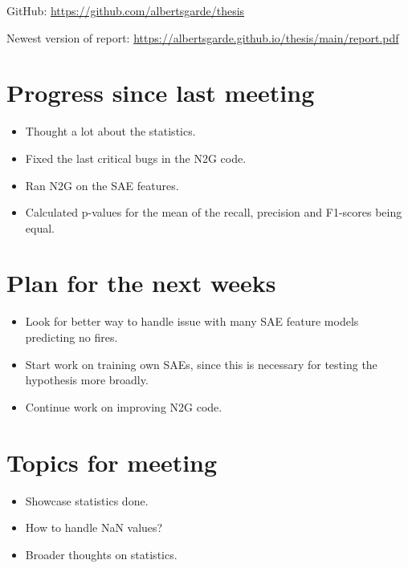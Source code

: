 \documentclass[main.tex]{subfiles}
\begin{document}
GitHub: \url{https://github.com/albertsgarde/thesis}

Newest version of report: \url{https://albertsgarde.github.io/thesis/main/report.pdf}


\section*{Progress since last meeting}
\begin{itemize}
    \item Thought a lot about the statistics.
    \item Fixed the last critical bugs in the N2G code.
    \item Ran N2G on the SAE features.
    \item Calculated p-values for the mean of the recall, precision and F1-scores being equal.
\end{itemize}
\section*{Plan for the next weeks}
\begin{itemize}
    \item Look for better way to handle issue with many SAE feature models predicting no fires.
    \item Start work on training own SAEs, since this is necessary for testing the hypothesis more broadly.
    \item Continue work on improving N2G code.
\end{itemize}
\section*{Topics for meeting}
\begin{itemize}
    \item Showcase statistics done.
    \item How to handle NaN values?
    \item Broader thoughts on statistics.
\end{itemize}
\end{document}
